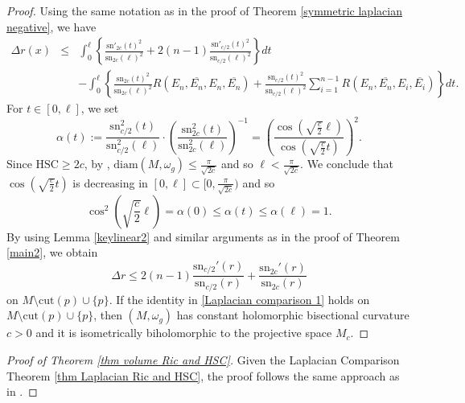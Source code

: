 \documentclass[12pt,reqno]{amsart}
\theoremstyle{plain}
\theoremstyle{definition}
\newcommand{\bproof}{\begin{proof}}
\newcommand{\eproof}{\end{proof}}
\renewcommand{\bar}{\overline}
\newcommand{\beq}{\begin{equation}}
\newcommand{\eeq}{\end{equation}}
\renewcommand{\>}{\rightarrow}
\numberwithin{equation}{section} %
\renewcommand{\leq}{\leqslant}
\renewcommand{\geq}{\geqslant}
\begin{document}
\bproof Using  the same notation as in the proof of Theorem \ref{symmetric laplacian negative}, we have
\begin{eqnarray}
\Delta r(x)&\leq &
\int_0^\ell \left\{ \frac{\mathrm{sn}'_{2c}(t)^2}{\mathrm{sn}_{2c}(\ell)^2}+2(n-1)\frac{\mathrm{sn}'_{c/2}(t)^2}{\mathrm{sn}_{c/2}(\ell)^2}\right\}dt \label{Laplacian estimate 3} \\
&&\nonumber-\int_0^\ell  \left\{\frac{\mathrm{sn}_{2c}(t)^2}{\mathrm{sn}_{2c}(\ell)^2} R\left(E_n,\bar{E_n},E_n,\bar{E_n}\right)
+\frac{\mathrm{sn}_{c/2}(t)^2}{\mathrm{sn}_{c/2}(\ell)^2}\sum_{i=1}^{n-1}R\left(E_n,\bar{E_n},E_i,\bar{E_i}\right) \right\}dt.
\end{eqnarray}
For $t\in[0,\ell]$, we set
\beq \alpha(t):=\frac{\mathrm{sn}_{c/2}^2(t)}{\mathrm{sn}_{c/2}^2(\ell)}\cdot \left(\frac{\mathrm{sn}_{2c}^2(t)}{\mathrm{sn}_{2c}^2(\ell)}\right)^{-1}=\left(\frac{\cos\left(\sqrt{\frac{c}{2}}\ell\right)}{\cos\left(\sqrt{\frac{c}{2}}t\right)}\right)^2.
\eeq
Since $\mathrm{HSC}\geq 2c$, by \cite{Tsu57}, $\mathrm{diam}(M,\omega_g)\leq \frac{\pi}{\sqrt{2c}}$ and so $\ell< \frac{\pi}{\sqrt{2c}} $. We conclude that $\cos\left(\sqrt{\frac{c}{2}}t\right)$ is decreasing in $[0,\ell]\subset [0,\frac{\pi}{\sqrt{2c}})$ and so
    \beq  \cos^{2}\left(\sqrt{\frac{c}{2}}\ell\right)=\alpha(0)\leq \alpha(t)\leq \alpha(\ell)=1.\eeq
By using Lemma \ref{keylinear2} and similar arguments as in the proof of Theorem \ref{main2}, we  obtain
$$
\Delta r\leq2(n-1)\frac{\mathrm{sn}_{c/2}'(r)}{\mathrm{sn}_{c/2}(r)}+\frac{\mathrm{sn}_{2c}'(r)}{\mathrm{sn}_{2c}(r)}
$$
on $M\setminus\mathrm{cut}(p)\cup \{p\}$.  If the identity in \eqref{Laplacian comparison 1} holds on $M\setminus\mathrm{cut}(p)\cup \{p\}$, then $(M,\omega_g)$ has constant holomorphic bisectional curvature $c>0$ and it is  isometrically biholomorphic to the projective space $M_c$.
\eproof


\baselineskip
\bproof[Proof of Theorem \ref{thm volume Ric and HSC}] Given the Laplacian Comparison Theorem \ref{thm Laplacian Ric and HSC},  the proof follows the same approach as in \cite[Theorem~1.3]{Yang25+}.
\eproof




\baselineskip
\end{document}

